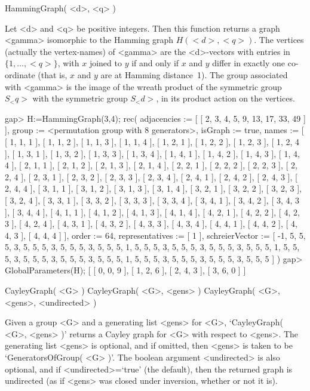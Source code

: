 
\>HammingGraph( <d>, <q> )

Let <d> and <q> be positive integers.  Then this function returns a
graph <gamma> isomorphic to the Hamming graph $H(<d>,<q>)$.  The vertices
(actually the vertex-names) of <gamma> are the <d>-vectors with entries
in $\{1,\ldots,<q>\}$, with $x$ joined to $y$ if and only if $x$ and $y$
differ in exactly one co-ordinate (that is, $x$ and $y$ are at Hamming
distance~1).  The group associated with <gamma> is the image of the wreath
product of the symmetric group $S_<q>$ with the symmetric group $S_<d>$,
in its product action on the vertices.

\beginexample
gap> H:=HammingGraph(3,4);
rec( adjacencies := [ [ 2, 3, 4, 5, 9, 13, 17, 33, 49 ] ], 
  group := <permutation group with 8 generators>, isGraph := true, 
  names := [ [ 1, 1, 1 ], [ 1, 1, 2 ], [ 1, 1, 3 ], [ 1, 1, 4 ], 
      [ 1, 2, 1 ], [ 1, 2, 2 ], [ 1, 2, 3 ], [ 1, 2, 4 ], [ 1, 3, 1 ], 
      [ 1, 3, 2 ], [ 1, 3, 3 ], [ 1, 3, 4 ], [ 1, 4, 1 ], [ 1, 4, 2 ], 
      [ 1, 4, 3 ], [ 1, 4, 4 ], [ 2, 1, 1 ], [ 2, 1, 2 ], [ 2, 1, 3 ], 
      [ 2, 1, 4 ], [ 2, 2, 1 ], [ 2, 2, 2 ], [ 2, 2, 3 ], [ 2, 2, 4 ], 
      [ 2, 3, 1 ], [ 2, 3, 2 ], [ 2, 3, 3 ], [ 2, 3, 4 ], [ 2, 4, 1 ], 
      [ 2, 4, 2 ], [ 2, 4, 3 ], [ 2, 4, 4 ], [ 3, 1, 1 ], [ 3, 1, 2 ], 
      [ 3, 1, 3 ], [ 3, 1, 4 ], [ 3, 2, 1 ], [ 3, 2, 2 ], [ 3, 2, 3 ], 
      [ 3, 2, 4 ], [ 3, 3, 1 ], [ 3, 3, 2 ], [ 3, 3, 3 ], [ 3, 3, 4 ], 
      [ 3, 4, 1 ], [ 3, 4, 2 ], [ 3, 4, 3 ], [ 3, 4, 4 ], [ 4, 1, 1 ], 
      [ 4, 1, 2 ], [ 4, 1, 3 ], [ 4, 1, 4 ], [ 4, 2, 1 ], [ 4, 2, 2 ], 
      [ 4, 2, 3 ], [ 4, 2, 4 ], [ 4, 3, 1 ], [ 4, 3, 2 ], [ 4, 3, 3 ], 
      [ 4, 3, 4 ], [ 4, 4, 1 ], [ 4, 4, 2 ], [ 4, 4, 3 ], [ 4, 4, 4 ] ], 
  order := 64, representatives := [ 1 ], 
  schreierVector := [ -1, 5, 5, 5, 3, 5, 5, 5, 3, 5, 5, 5, 3, 5, 5, 5, 1, 5, 
      5, 5, 3, 5, 5, 5, 3, 5, 5, 5, 3, 5, 5, 5, 1, 5, 5, 5, 3, 5, 5, 5, 3, 
      5, 5, 5, 3, 5, 5, 5, 1, 5, 5, 5, 3, 5, 5, 5, 3, 5, 5, 5, 3, 5, 5, 5 ] )
gap> GlobalParameters(H);
[ [ 0, 0, 9 ], [ 1, 2, 6 ], [ 2, 4, 3 ], [ 3, 6, 0 ] ]
\endexample


\>CayleyGraph( <G> )
\>CayleyGraph( <G>, <gens> )
\>CayleyGraph( <G>, <gens>, <undirected> )
 
Given a group <G> and a generating list <gens> for  <G>, `CayleyGraph(
<G>, <gens> )' returns a Cayley graph for  <G>  with respect to <gens>.
The generating list <gens> is optional, and if omitted, then <gens> is
taken to be `GeneratorsOfGroup( <G> )'. The boolean argument <undirected>
is also optional, and if <undirected>=`true' (the default), then the
returned graph is undirected (as if <gens> was closed under inversion,
whether or not it is).

